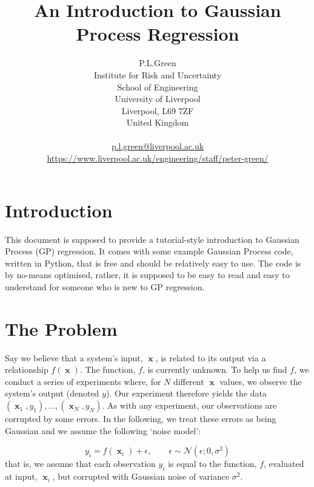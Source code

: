 \documentclass[a4paper, 11pt]{article}
\DeclareMathOperator{\x}{\boldsymbol{x}}
\begin{document}
\title{An Introduction to Gaussian Process Regression}
\author{P.L.Green\\
Institute for Risk and Uncertainty\\
School of Engineering\\
University of Liverpool\\
Liverpool, L69 7ZF\\
United Kingdom\\
\\
\href{mailto:p.l.green@liverpool.ac.uk}{p.l.green@liverpool.ac.uk} \\
\url{https://www.liverpool.ac.uk/engineering/staff/peter-green/}
}
\maketitle

\section{Introduction}
This document is supposed to provide a tutorial-style introduction to Gaussian Process (GP) regression. It comes with some example Gaussian Process code, written in Python, that is free and should be relatively easy to use. The code is by no-means optimised, rather, it is supposed to be easy to read and easy to understand for someone who is new to GP regression. 

\section{The Problem}
Say we believe that a system's input, $\x$, is related to its output via a relationship $f(\x)$. The function, $f$, is currently unknown. To help us find $f$, we conduct a series of experiments where, for $N$ different $\x$ values, we observe the system's output (denoted $y$). Our experiment therefore yields the data $(\x_1,y_1),...,(\x_N,y_N)$. As with any experiment, our observations are corrupted by some errors. In the following, we treat these errors as being Gaussian and we assume the following `noise model':

\begin{equation}
	y_i = f(\x_i) + \epsilon, \qquad \epsilon \sim \mathcal{N}(\epsilon;0,\sigma^2)
	\label{eq:noise_model}
\end{equation}
that is, we assume that each observation $y_i$ is equal to the function, $f$, evaluated at input, $\x_i$, but corrupted with Gaussian noise of variance $\sigma^2$. 
\end{document}
